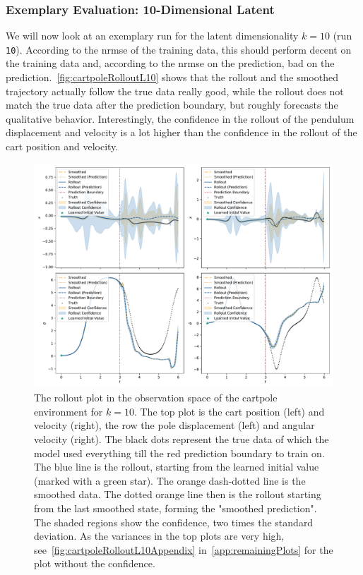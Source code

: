 		\subsubsection{Exemplary Evaluation: 10-Dimensional Latent}
			\label{subsubsec:cartpoleL10}

			We will now look at an exemplary run for the latent dimensionality \( k = 10 \) (run \texttt{10}). According to the \ac{nrmse} of the training data, this should perform decent on the training data and, according to the \ac{nrmse} on the prediction, bad on the prediction.~\autoref{fig:cartpoleRolloutL10} shows that the rollout and the smoothed trajectory actually follow the true data really good, while the rollout does not match the true data after the prediction boundary, but roughly forecasts the qualitative behavior. Interestingly, the confidence in the rollout of the pendulum displacement and velocity is a lot higher than the confidence in the rollout of the cart position and velocity.

			\begin{figure}
				\centering
				\includegraphics[width=\linewidth]{figures/results/cartpole-gym/run-latent-dim-10/rollout-observations-N0.pdf}
				\caption[Rollout of the cartpole experiment for 10 latent dimensions]{The rollout plot in the observation space of the cartpole environment for \(k = 10\). The top plot is the cart position (left) and velocity (right), the row the pole displacement (left) and angular velocity (right). The black dots represent the true data of which the model used everything till the red prediction boundary to train on. The blue line is the rollout, starting from the learned initial value (marked with a green star). The orange dash-dotted line is the smoothed data. The dotted orange line then is the rollout starting from the last smoothed state, forming the "smoothed prediction". The shaded regions show the confidence, \ie two times the standard deviation. As the variances in the top plots are very high, see~\autoref{fig:cartpoleRolloutL10Appendix} in~\autoref{app:remainingPlots} for the plot without the confidence.}
				\label{fig:cartpoleRolloutL10}
			\end{figure}

